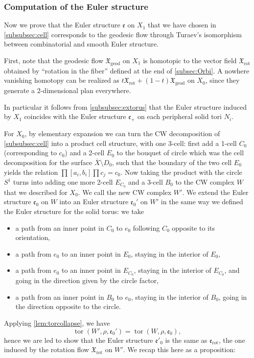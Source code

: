 \documentclass[JEP,XML,SOM,Unicode,NoFloatCountersInSection,published]{cedram}
\theoremstyle{plain}
\theoremstyle{definition}
\theoremstyle{remark}
\newcommand{\rot}{\mathrm{rot}}
\newcommand{\geod}{\mathrm{geod}}
\numberwithin{equation}{section}
\DeclareMathOperator{\tor}{tor}
\begin{document}
\subsubsection{Computation of the Euler structure}
\label{subsubsec:Euler}
Now we prove that the Euler structure $\mathfrak e$ on $X_1$ that we have chosen in \cref{subsubsec:cell} corresponds to the geodesic flow through Turaev's isomorphism between combinatorial and smooth Euler structure.

First, note that the geodesic flow $\mathfrak X_\geod$ on $X_1$ is homotopic to the vector field $\mathfrak X_{\rot}$
obtained by ``rotation in the fiber'' defined at the end of \cref{subsec:Orbi}. A nowhere vanishing homotopy can be realized as $t \mathfrak X_\rot + (1-t) \mathfrak X_{\geod}$ on $X_0$, since they generate a 2-dimensional plan everywhere.

In particular it follows from \cref{subsubsec:extorus} that the Euler structure induced by $X_1$ coincides with the Euler structure $\mathfrak e_+$ on each peripheral solid tori $N_i$.

For $X_0$, by elementary expansion we can turn the CW decomposition of \cref{subsubsec:cell} into a product cell structure, with one 3-cell:
first add a 1-cell $C_0$ (corresponding to $c_0$) and a 2-cell $E_0$ to the bouquet of circle which was the cell decomposition for the surface $\overline X \setminus D_0$, such that the boundary of the two cell $E_0$ yields the relation $\prod[a_i, b_i]\prod c_j = c_0$. Now taking the product with the circle $S^1$ turns into adding one more 2-cell $E_{C_0}$ and a 3-cell $B_0$ to the CW complex $W$ that we described for $X_0$. We call the new CW complex $W'$. We extend the Euler structure $\mathfrak e_0$ on $W$ into an Euler structure $\mathfrak e_0'$ on $W'$ in the same way we defined the Euler structure for the solid torus: we take
\begin{itemize}
\item
a path from an inner point in $C_0$ to $e_0$ following $C_0$ opposite to its orientation,
\item
a path from $e_0$ to an inner point in $E_0$, staying in the interior of $E_0$,
\item
a path from $e_0$ to an inner point in $E_{C_0}$, staying in the interior of $E_{C_0}$, and going in the direction given by the circle factor,
\item
a path from an inner point in $B_0$ to $e_0$, staying in the interior of $B_0$, going in the direction opposite to the circle.
\end{itemize}
Applying \cref{lem:torcollapse}, we have
\[
\tor(W', \rho, \mathfrak e_0') = \tor(W, \rho, \mathfrak e_0),
\]
hence we are led to show that the Euler structure $\mathfrak e'_0$ is the same as $\mathfrak e_\rot$, the one induced by the rotation flow $\mathfrak X_\rot$ on $W'$. We recap this here as a proposition:
\end{document}
